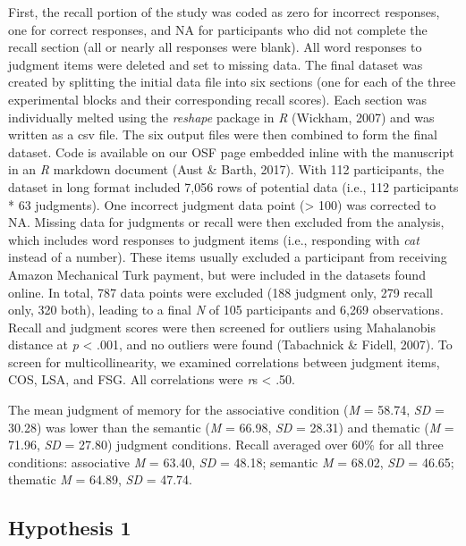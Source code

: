 \documentclass[english,man]{apa6}
\theoremstyle{definition}
\theoremstyle{definition}
\theoremstyle{definition}
\theoremstyle{remark}
\begin{document}
First, the recall portion of the study was coded as zero for incorrect
responses, one for correct responses, and NA for participants who did
not complete the recall section (all or nearly all responses were
blank). All word responses to judgment items were deleted and set to
missing data. The final dataset was created by splitting the initial
data file into six sections (one for each of the three experimental
blocks and their corresponding recall scores). Each section was
individually melted using the \emph{reshape} package in \emph{R}
(Wickham, 2007) and was written as a csv file. The six output files were
then combined to form the final dataset. Code is available on our OSF
page embedded inline with the manuscript in an \emph{R} markdown
document (Aust \& Barth, 2017). With 112 participants, the dataset in
long format included 7,056 rows of potential data (i.e., 112
participants * 63 judgments). One incorrect judgment data point
(\textgreater{} 100) was corrected to NA. Missing data for judgments or
recall were then excluded from the analysis, which includes word
responses to judgment items (i.e., responding with \emph{cat} instead of
a number). These items usually excluded a participant from receiving
Amazon Mechanical Turk payment, but were included in the datasets found
online. In total, 787 data points were excluded (188 judgment only, 279
recall only, 320 both), leading to a final \emph{N} of 105 participants
and 6,269 observations. Recall and judgment scores were then screened
for outliers using Mahalanobis distance at \emph{p} \textless{} .001,
and no outliers were found (Tabachnick \& Fidell, 2007). To screen for
multicollinearity, we examined correlations between judgment items, COS,
LSA, and FSG. All correlations were \emph{r}s \textless{} .50.

The mean judgment of memory for the associative condition (\emph{M} =
58.74, \emph{SD} = 30.28) was lower than the semantic (\emph{M} = 66.98,
\emph{SD} = 28.31) and thematic (\emph{M} = 71.96, \emph{SD} = 27.80)
judgment conditions. Recall averaged over 60\% for all three conditions:
associative \emph{M} = 63.40, \emph{SD} = 48.18; semantic \emph{M} =
68.02, \emph{SD} = 46.65; thematic \emph{M} = 64.89, \emph{SD} = 47.74.

\subsection{Hypothesis 1}\label{hypothesis-1}
\end{document}
